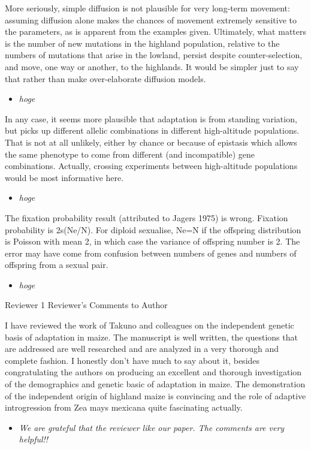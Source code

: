 \documentclass[onecolumn,oneside,letterpaper]{article}
\begin{document}
More seriously, simple diffusion is not plausible for very long-term movement: assuming diffusion alone makes the chances of movement extremely sensitive to the parameters, as is apparent from the examples given.  Ultimately, what matters is the number of new mutations in the highland population, relative to the numbers of mutations that arise in the lowland, persist despite counter-selection, and move, one way or another, to the highlands.  It would be simpler just to say that rather than make over-elaborate diffusion models. 
\setlength{\parskip}{-5.0pt}
\begin{itemize}
\item \textit{ hoge }
\end{itemize}
\setlength{\parskip}{10.0pt}

In any case, it seems more plausible that adaptation is from standing variation, but picks up different allelic combinations in different high-altitude populations.  That is not at all unlikely, either by chance or because of epistasis which allows the same phenotype to come from different (and incompatible) gene combinations.  Actually, crossing experiments between high-altitude populations would be most informative here. 
\setlength{\parskip}{-5.0pt}
\begin{itemize}
\item \textit{ hoge }
\end{itemize}
\setlength{\parskip}{10.0pt}

The fixation probability result (attributed to Jagers 1975) is wrong.  Fixation probability is 2s(Ne/N).  For diploid sexualise, Ne=N if the offspring distribution is Poisson with mean 2, in which case the variance of offspring number is 2.  The error may have come from confusion between numbers of genes and numbers of offspring from a sexual pair.
\setlength{\parskip}{-5.0pt}
\begin{itemize}
\item \textit{ hoge }
\end{itemize}
\setlength{\parskip}{10.0pt}


Reviewer 1 Reviewer's Comments to Author

I have reviewed the work of Takuno and colleagues on the independent genetic basis of adaptation in maize. The manuscript is well written, the questions that are addressed are well researched and are analyzed in a very thorough and complete fashion. I honestly don't have much to say about it, besides congratulating the authors on producing an excellent and thorough investigation of the demographics and genetic basic of adaptation in maize. The demonstration of the independent origin of highland maize is convincing and the role of adaptive introgression from Zea mays mexicana quite fascinating actually.  
\setlength{\parskip}{-5.0pt}
\begin{itemize}
\item \textit{ We are grateful that the reviewer like our paper.  The comments are very helpful!! }
\end{itemize}
\setlength{\parskip}{10.0pt}
\end{document}

